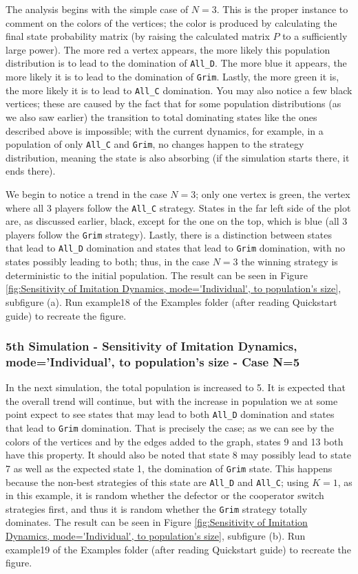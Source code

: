 The analysis begins with the simple case of $N=3$. This is the proper instance to comment on the colors of the vertices; the color is produced by calculating the final state probability matrix (by raising the calculated matrix $P$ to a sufficiently large power). The more red a vertex appears, the more likely this population distribution is to lead to the domination of \texttt{All\_D}. The more blue it appears, the more likely it is to lead to the domination of \texttt{Grim}. Lastly, the more green it is, the more likely it is to lead to \texttt{All\_C} domination. You may also notice a few black vertices; these are caused by the fact that for some population distributions (as we also saw earlier) the transition to total dominating states like the ones described above is impossible; with the current dynamics, for example, in a population of only \texttt{All\_C} and \texttt{Grim}, no changes happen to the strategy distribution, meaning the state is also absorbing (if the simulation starts there, it ends there).

We begin to notice a trend in the case $N=3$; only one vertex is green, the vertex where all 3 players follow the \texttt{All\_C} strategy. States in the far left side of the plot are, as discussed earlier, black, except for the one on the top, which is blue (all 3 players follow the \texttt{Grim} strategy). Lastly, there is a distinction between states that lead to \texttt{All\_D} domination and states that lead to \texttt{Grim} domination, with no states possibly leading to both; thus, in the case $N=3$ the winning strategy is deterministic to the initial population. The result can be seen in Figure \ref{fig:Sensitivity of Imitation Dynamics, mode='Individual', to population's size}, subfigure (a). Run example18 of the Examples folder (after reading Quickstart guide) to recreate the figure.

\subsubsection{5th Simulation - Sensitivity of Imitation Dynamics, mode='Individual', to population's size - Case N=5}
In the next simulation, the total population is increased to 5. It is expected that the overall trend will continue, but with the increase in population we at some point expect to see states that may lead to both \texttt{All\_D} domination and states that lead to \texttt{Grim} domination. That is precisely the case; as we can see by the colors of the vertices and by the edges added to the graph, states 9 and 13 both have this property. It should also be noted that state 8 may possibly lead to state 7 as well as the expected state 1, the domination of \texttt{Grim} state. This happens because the non-best strategies of this state are \texttt{All\_D} and \texttt{All\_C}; using $K=1$, as in this example, it is random whether the defector or the cooperator switch strategies first, and thus it is random whether the \texttt{Grim} strategy totally dominates. The result can be seen in Figure \ref{fig:Sensitivity of Imitation Dynamics, mode='Individual', to population's size}, subfigure (b). Run example19 of the Examples folder (after reading Quickstart guide) to recreate the figure.

